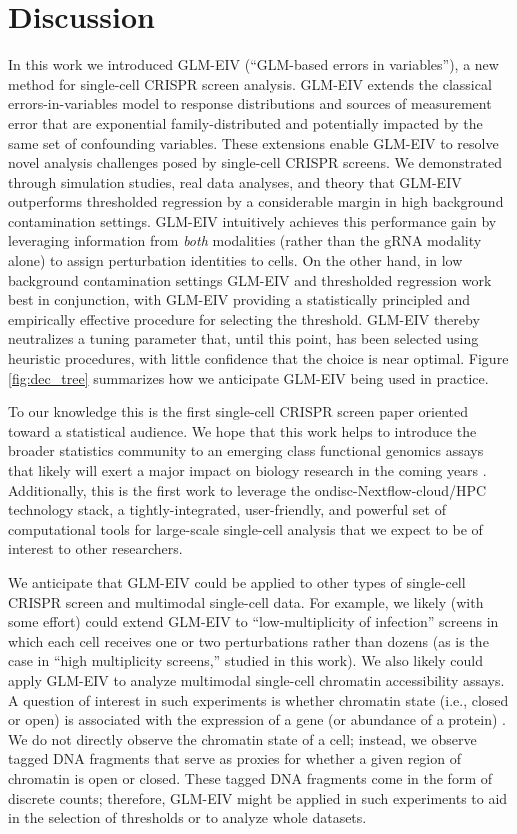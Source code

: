 \documentclass[11pt]{article}
\begin{document}
\section{Discussion}

In this work we introduced GLM-EIV (``GLM-based errors in variables''), a new method for single-cell CRISPR screen analysis. GLM-EIV extends the classical errors-in-variables model to response distributions and sources of measurement error that are exponential family-distributed and potentially impacted by the same set of confounding variables. These extensions enable GLM-EIV to resolve novel analysis challenges posed by single-cell CRISPR screens. We demonstrated through simulation studies, real data analyses, and theory that GLM-EIV outperforms thresholded regression by a considerable margin in high background contamination settings. GLM-EIV intuitively achieves this performance gain by leveraging information from \textit{both} modalities (rather than the gRNA modality alone) to assign perturbation identities to cells. On the other hand, in low background contamination settings GLM-EIV and thresholded regression work best in conjunction, with GLM-EIV providing a statistically principled and empirically effective procedure for selecting the threshold. GLM-EIV thereby neutralizes a tuning parameter that, until this point, has been selected using heuristic procedures, with little confidence that the choice is near optimal. Figure \ref{fig:dec_tree} summarizes how we anticipate GLM-EIV being used in practice.

To our knowledge this is the first single-cell CRISPR screen paper oriented toward a statistical audience. We hope that this work helps to introduce the broader statistics community to an emerging class functional genomics assays that likely will exert a major impact on biology research in the coming years \cite{Przybyla2021}. Additionally, this is the first work to leverage the ondisc-Nextflow-cloud/HPC technology stack, a tightly-integrated, user-friendly, and powerful set of computational tools for large-scale single-cell analysis that we expect to be of interest to other researchers.

We anticipate that GLM-EIV could be applied to other types of single-cell CRISPR screen and multimodal single-cell data. For example, we likely (with some effort) could extend GLM-EIV to ``low-multiplicity of infection'' screens \cite{Schraivogel2020} in which each cell receives one or two perturbations rather than dozens (as is the case in ``high multiplicity screens,'' studied in this work). We also likely could apply GLM-EIV to analyze multimodal single-cell chromatin accessibility assays. A question of interest in such experiments is whether chromatin state (i.e., closed or open) is associated with the expression of a gene (or abundance of a protein) \cite{Mimitou2021}. We do not directly observe the chromatin state of a cell; instead, we observe tagged DNA fragments that serve as proxies for whether a given region of chromatin is open or closed. These tagged DNA fragments come in the form of discrete counts; therefore, GLM-EIV might be applied in such experiments to aid in the selection of thresholds or to analyze whole datasets. 
\end{document}
